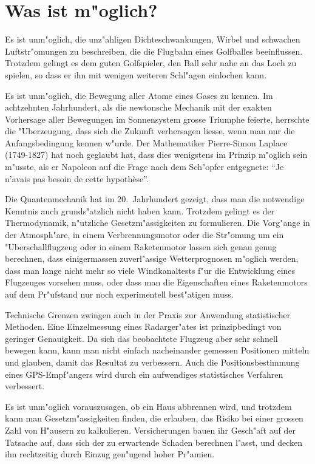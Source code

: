 \section*{Was ist m"oglich?}
Es ist unm"oglich, die unz"ahligen Dichteschwankungen, Wirbel und
schwachen Luftstr"omungen zu beschreiben, die die Flugbahn eines
Golfballes beeinflussen. Trotzdem gelingt es dem guten Golfspieler,
den Ball sehr nahe an das Loch zu spielen, so dass er ihn mit wenigen
weiteren Schl"agen einlochen kann.

Es ist unm"oglich, die Bewegung aller Atome eines Gases zu kennen.
Im achtzehnten Jahrhundert, als die newtonsche Mechanik mit der
exakten Vorhersage aller Bewegungen im Sonnensystem grosse Triumphe
feierte, herrschte die "Uberzeugung, dass sich die Zukunft verhersagen
liesse, wenn man nur die Anfangsbedingung kennen w"urde.
Der Mathematiker Pierre-Simon Laplace (1749-1827) hat noch geglaubt hat, dass dies
wenigstens im Prinzip m"oglich sein m"usste, als er Napoleon auf die Frage
nach dem Sch"opfer entgegnete: ``Je n'avais pas besoin de cette hypoth\`ese''.

Die Quantenmechanik hat
im 20.~Jahrhundert gezeigt, dass man die notwendige Kenntnis auch
grunds"atzlich nicht haben kann. Trotzdem gelingt es der Thermodynamik,
n"utzliche Gesetzm"assigkeiten zu formulieren. Die
Vorg"ange in der Atmosph"are, in einem Verbrennungsmotor oder die
Str"omung um ein "Uberschallflugzeug oder in einem Raketenmotor
lassen sich genau genug berechnen, dass einigermassen zuverl"assige
Wetterprognosen m"oglich werden, dass man lange nicht mehr so viele
Windkanaltests f"ur die Entwicklung eines Flugzeuges vorsehen muss,
oder dass man die Eigenschaften eines Raketenmotors auf dem
Pr"ufstand nur noch experimentell best"atigen muss.

Technische Grenzen zwingen auch in der Praxis zur Anwendung statistischer
Methoden. Eine Einzelmessung eines Radarger"ates ist prinzipbedingt
von geringer
Genauigkeit. Da sich das beobachtete Flugzeug aber sehr schnell bewegen
kann, kann man nicht einfach nacheinander gemessen Positionen mitteln
und glauben, damit das Resultat zu verbessern. Auch die Positionsbestimmung
eines GPS-Empf"angers wird durch ein aufwendiges statistisches Verfahren
verbessert.

Es ist unm"oglich vorauszusagen, ob ein Haus abbrennen wird, und
trotzdem kann man Gesetzm"assigkeiten finden, die erlauben, das
Risiko bei einer grossen Zahl von H"ausern zu kalkulieren.
Versicherungen bauen ihr Gesch"aft auf der Tatsache auf, dass
sich der zu erwartende Schaden berechnen l"asst, und decken ihn
rechtzeitig durch Einzug gen"ugend hoher Pr"amien.

